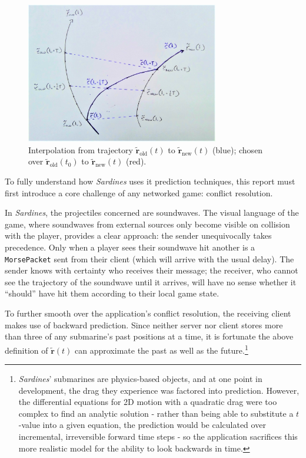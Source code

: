 \documentclass[a4paper, 9pt]{article}
\begin{document}
\begin{flushleft}
\begin{figure}[h]
\centering
\includegraphics[width=0.75\textwidth]{Interpolation}
\caption{Interpolation from trajectory $\mathbf{\tilde{r}}_{\textrm{old}}(t)$ to $\mathbf{\tilde{r}}_{\textrm{new}}(t)$ (blue); chosen over $\mathbf{\tilde{r}}_{\textrm{old}}(t_0)$ to $\mathbf{\tilde{r}}_{\textrm{new}}(t)$ (red).}
\label{Interpolation}
\end{figure}

\vspace{5pt}\noindent
To fully understand how \textit{Sardines} uses it prediction techniques, this report must first introduce a core challenge of any networked game: conflict resolution.

\vspace{5pt}\noindent
In \textit{Sardines}, the projectiles concerned are soundwaves. The visual language of the game, where soundwaves from external sources only become visible on collision with the player, provides a clear approach: the sender unequivocally takes precedence. Only when a player sees their soundwave hit another is a \texttt{MorsePacket} sent from their client (which will arrive with the usual delay). The sender knows with certainty who receives their message; the receiver, who cannot see the trajectory of the soundwave until it arrives, will have no sense whether it ``should'' have hit them according to their local game state.

\vspace{5pt}\noindent
To further smooth over the application's conflict resolution, the receiving client makes use of backward prediction. Since neither server nor client stores more than three of any submarine's past positions at a time, it is fortunate the above definition of $\mathbf{\tilde{r}}(t)$ can approximate the past as well as the future.\footnote{\textit{Sardines}' submarines are physics-based objects, and at one point in development, the drag they experience was factored into prediction. However, the differential equations for 2D motion with a quadratic drag were too complex to find an analytic solution - rather than being able to substitute a $t$-value into a given equation, the prediction would be calculated over incremental, irreversible forward time steps - so the application sacrifices this more realistic model for the ability to look backwards in time.}


\end{flushleft}
\end{document}
